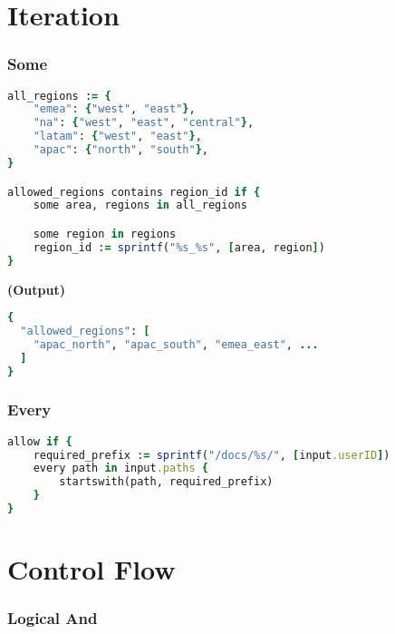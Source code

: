 \documentclass[twocolumn]{article}
\begin{document}
\section*{Iteration}




\vspace{-1em}
\subsubsection*{Some}

\begin{lstlisting}[language=Ruby]
all_regions := {
	"emea": {"west", "east"},
	"na": {"west", "east", "central"},
	"latam": {"west", "east"},
	"apac": {"north", "south"},
}

allowed_regions contains region_id if {
	some area, regions in all_regions

	some region in regions
	region_id := sprintf("%s_%s", [area, region])
}
\end{lstlisting}



\textbf{\tiny{(Output)}}
\begin{lstlisting}[language=Ruby]
{
  "allowed_regions": [
    "apac_north", "apac_south", "emea_east", ...
  ]
}
\end{lstlisting}



\vspace{-1em}
\subsubsection*{Every}

\begin{lstlisting}[language=Ruby]
allow if {
	required_prefix := sprintf("/docs/%s/", [input.userID])
	every path in input.paths {
		startswith(path, required_prefix)
	}
}
\end{lstlisting}









\section*{Control Flow}




\vspace{-1em}
\subsubsection*{Logical And}
\end{document}
